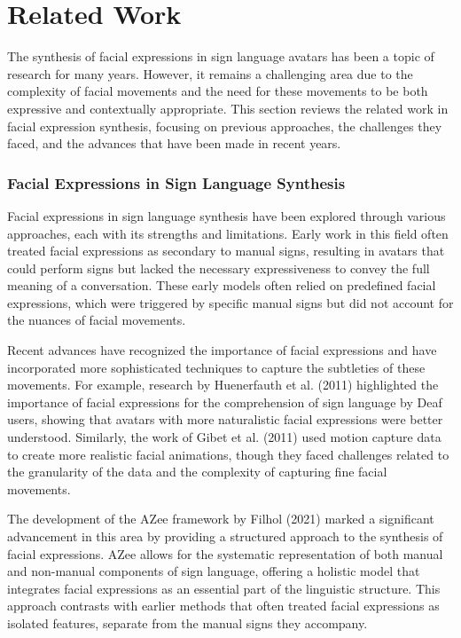 \documentclass[../../main.tex]{subfiles}
\begin{document}
\section{Related Work}
\label{ch:facial_expressions:related_work}

The synthesis of facial expressions in sign language avatars has been a topic of research for many years. However, it remains a challenging area due to the complexity of facial movements and the need for these movements to be both expressive and contextually appropriate. This section reviews the related work in facial expression synthesis, focusing on previous approaches, the challenges they faced, and the advances that have been made in recent years.

\subsubsection{Facial Expressions in Sign Language Synthesis}

Facial expressions in sign language synthesis have been explored through various approaches, each with its strengths and limitations. Early work in this field often treated facial expressions as secondary to manual signs, resulting in avatars that could perform signs but lacked the necessary expressiveness to convey the full meaning of a conversation. These early models often relied on predefined facial expressions, which were triggered by specific manual signs but did not account for the nuances of facial movements.

Recent advances have recognized the importance of facial expressions and have incorporated more sophisticated techniques to capture the subtleties of these movements. For example, research by Huenerfauth et al. (2011) highlighted the importance of facial expressions for the comprehension of sign language by Deaf users, showing that avatars with more naturalistic facial expressions were better understood. Similarly, the work of Gibet et al. (2011) used motion capture data to create more realistic facial animations, though they faced challenges related to the granularity of the data and the complexity of capturing fine facial movements.

The development of the AZee framework by Filhol (2021) marked a significant advancement in this area by providing a structured approach to the synthesis of facial expressions. AZee allows for the systematic representation of both manual and non-manual components of sign language, offering a holistic model that integrates facial expressions as an essential part of the linguistic structure. This approach contrasts with earlier methods that often treated facial expressions as isolated features, separate from the manual signs they accompany.
\end{document}
